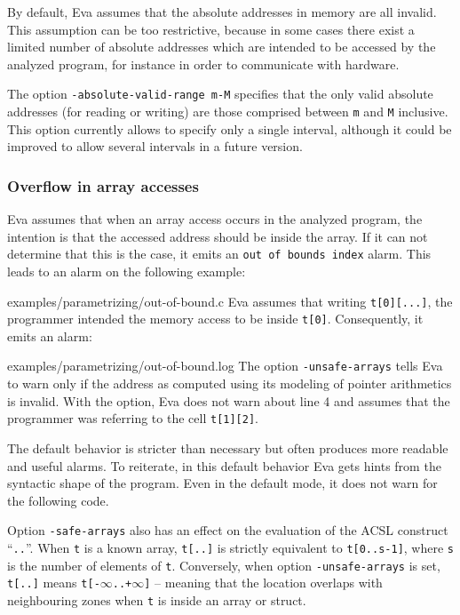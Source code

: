 \documentclass[web]{frama-c-book}
\newcommand{\Eva}{\textsf{Eva}}
\begin{document}
By default, \Eva{} assumes that the absolute addresses in
memory are all invalid. This assumption can be too restrictive,
because in some cases there exist a limited number of absolute
addresses which are intended to be accessed by the analyzed program,
for instance in order to communicate with hardware.

The option \lstinline|-absolute-valid-range m-M|
specifies that the only valid absolute addresses (for reading or writing)
are those comprised between \lstinline$m$ and \lstinline$M$ inclusive.
This option currently allows to specify only a single interval,
although it could be improved to allow several intervals
in a future version.


\subsubsection{Overflow in array accesses}
\label{unsafe-arrays}

\Eva{} assumes that when an array
access occurs in the analyzed program, the intention is that the
accessed address should be inside the array. If it can not determine that
this is the case, it emits an \lstinline|out of bounds index| 
alarm. This leads to an alarm on the following example:

  {examples/parametrizing/out-of-bound.c}
\Eva{} assumes that writing \lstinline|t[0][...]|, the programmer
intended the memory access to be inside \lstinline|t[0]|. Consequently,
it emits an alarm:

  {examples/parametrizing/out-of-bound.log}
The option \lstinline|-unsafe-arrays| tells \Eva{} to warn
only if the address as computed using its modeling of pointer arithmetics
is invalid. With the option, \Eva{} does not warn about line 4
and assumes that the programmer
was referring to the cell \lstinline|t[1][2]|.

The default behavior is stricter than necessary but often produces more
readable and useful alarms. To reiterate, in this default behavior
\Eva{} gets hints from the syntactic shape of the program.
Even in the default mode, it does not warn for the following code.
\begin{listing}{4}
  int *p=&t[0][12];
  return *p;
}
\end{listing}

Option \lstinline|-safe-arrays| also has an effect on the evaluation
of the ACSL construct ``\lstinline|..|''. When \lstinline|t| is a
known array, \lstinline|t[..]| is strictly equivalent to
\lstinline|t[0..s-1]|, where \lstinline|s| is the number of elements
of \lstinline|t|. Conversely, when option \lstinline|-unsafe-arrays| is
set, \lstinline|t[..]| means
\lstinline|t[-|$\infty$\lstinline|..+|$\infty$\lstinline|]| -- meaning
that the location overlaps with neighbouring zones when \lstinline|t| is
inside an array or struct.
\end{document}
